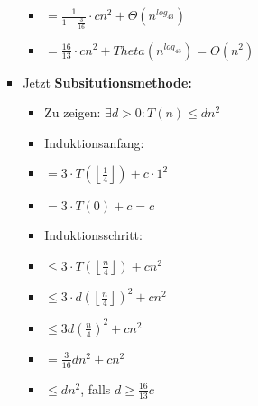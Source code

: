 \begin{itemize}
\begin{itemize}
\begin{itemize}
\begin{itemize}
                                \item[] {\makebox[0.75cm][l]{}} $= \frac{1}{1-\frac{3}{16}} \cdot cn^2 + \Theta(n^{log_43})$ 
                                \item[] {\makebox[0.75cm][l]{}} $ = \frac{16}{13} \cdot cn^2 + Theta(n^{log_43}) = O(n^2)$
                            \end{itemize}
                        \item Jetzt \textbf{Subsitutionsmethode:}
                            \begin{itemize}
                                \item Zu zeigen: $\exists d > 0: T(n) \leq dn^2$
                                \item Induktionsanfang:
                                \item[] {} $= 3 \cdot T(\left \lfloor \frac{1}{4} \right \rfloor) + c \cdot 1^2$
                                \item[] {\makebox[0.75cm][l]{}} $= 3 \cdot T(0) + c = c$
                                \item Induktionsschritt:
                                \item[] {} $\leq 3 \cdot T(\left \lfloor \frac{n}{4} \right \rfloor) + cn^2$
                                \item[] {\makebox[0.75cm][l]{}} $\leq 3 \cdot d(\left \lfloor \frac{n}{4} \right \rfloor)^2+cn^2$
                                \item[] {\makebox[0.75cm][l]{}} $\leq 3d(\frac{n}{4})^2 + cn^2$
                                \item[] {\makebox[0.75cm][l]{}} $= \frac{3}{16}dn^2+cn^2$
                                \item[] {\makebox[0.75cm][l]{}} $\leq dn^2$, falls $d \geq \frac{16}{13}c$ 
                            \end{itemize}

                    \end{itemize}
            \end{itemize}


\end{itemize}
